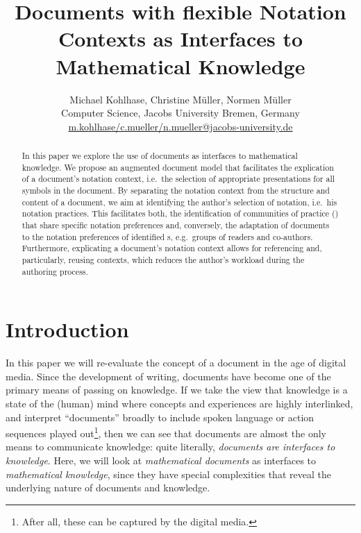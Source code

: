 \documentclass[pdftex,bibtotocnumbered,idxtotoc,11pt]{scrartcl}
\title{Documents with flexible Notation Contexts as Interfaces to Mathematical Knowledge}
\author{Michael Kohlhase, Christine M{\"u}ller, Normen M{\"u}ller\\ 
  Computer Science, Jacobs University Bremen, Germany\\
  {\small\url{m.kohlhase/c.mueller/n.mueller@jacobs-university.de}}}
\date{}
\begin{document}
\maketitle

\begin{abstract}\vspace*{-.7cm}
  In this paper we explore the use of documents as interfaces to mathematical
  knowledge. We propose an augmented document model that facilitates the explication of a
  document's notation context, i.e.\ the selection of appropriate presentations for all
  symbols in the document. By separating the notation context from the structure and
  content of a document, we aim at identifying the author's selection of notation, i.e.\
  his notation practices. This facilitates both, the identification of communities of
  practice ({\cop}) that share specific notation preferences and, conversely, the
  adaptation of documents to the notation preferences of identified {\cop}s, e.g.\ groups
  of readers and co-authors. Furthermore, explicating a document's notation context allows
  for referencing and, particularly, reusing contexts, which reduces the author's workload
  during the authoring process.
\end{abstract}

\section{Introduction}\label{sec:intro} 

In this paper we will re-evaluate the concept of a document in the age of digital
media. Since the development of writing, documents have become one of the primary means of
passing on knowledge. If we take the view that knowledge is a state of the (human) mind
where concepts and experiences are highly interlinked, and interpret ``documents'' broadly
to include spoken language or action sequences played out\footnote{After all, these can be
  captured by the digital media.}, then we can see that documents are almost the only
means to communicate knowledge: quite literally, {\emph{documents are interfaces to
    knowledge}}. Here, we will look at {\emph{mathematical documents}} as interfaces to
{\emph{mathematical knowledge}}, since they have special complexities that reveal the
underlying nature of documents and knowledge.
\end{document}
